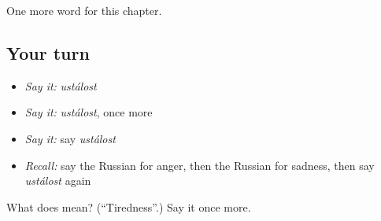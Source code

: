 \begin{grammarlens}[title={What you've built}]
One more word for this chapter.
\end{grammarlens}

\subsection*{Your turn}
\begin{itemize}
\raggedright
  \item \emph{Say it:} \emph{ustálost}
  \item \emph{Say it:} \emph{ustálost}, once more
  \item \emph{Say it:} say \emph{ustálost}
  \item \emph{Recall:} say the Russian for anger, then the Russian for sadness, then say \emph{ustálost} again
\end{itemize}

\begin{tcolorbox}[breakable,colback=teal!4,colframe=teal!35!black,title={Before you move on}]
What does  mean? (\textquotedblleft{}Tiredness\textquotedblright{}.) Say it once more.
\end{tcolorbox}
